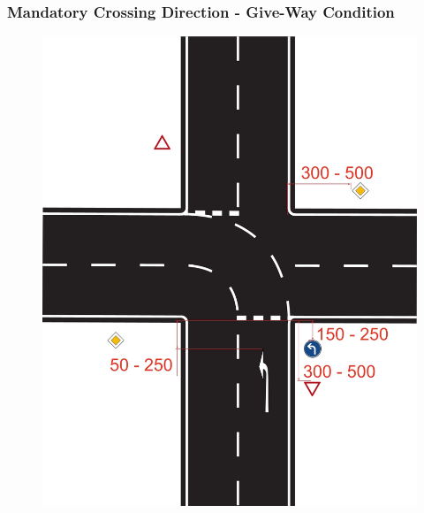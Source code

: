 \subsubsection{Mandatory Crossing Direction - Give-Way Condition}
\begin{figure}[H]
	\begin{center}
		\centering\includegraphics[]{graphics/Abb_15_mandatory_give_way.jpg}
	\end{center}
\end{figure}


